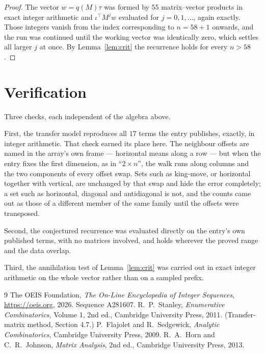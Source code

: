 \documentclass[11pt,a4paper]{article}
\theoremstyle{plain}
\theoremstyle{definition}
\begin{document}
\begin{proof}
The vector $w=q(M)\tau$ was formed by $55$ matrix--vector products in exact integer
arithmetic and $\iota^{\!\top}M^{j}w$ evaluated for $j=0,1,\dots$, again exactly. Those
integers vanish from the index corresponding to $n=58+1$ onwards, and the run was
continued until the working vector was identically zero, which settles all larger $j$ at once.
By Lemma~\ref{lem:crit} the recurrence holds for every $n>58$.
\end{proof}

\section{Verification}

Three checks, each independent of the algebra above.

First, the transfer model reproduces all $17$ terms the entry publishes, exactly, in
integer arithmetic. That check earned its place here. The neighbour offsets are named in the
array's own frame --- horizontal means along a row --- but when the entry fixes the first
dimension, as in ``$2\times n$'', the walk runs along columns and the two components of every
offset swap. Sets such as king-move, or horizontal together with vertical, are unchanged by
that swap and hide the error completely; a set such as horizontal, diagonal and antidiagonal
is not, and the counts came out as those of a different member of the same family until the
offsets were transposed.

Second, the conjectured recurrence was evaluated directly on the entry's own published terms,
with no matrices involved, and holds wherever the proved range and the data overlap.

Third, the annihilation test of Lemma~\ref{lem:crit} was carried out in exact integer
arithmetic on the whole vector rather than on a sampled prefix.

\begin{thebibliography}{9}
 The OEIS Foundation, \emph{The On-Line Encyclopedia of Integer
Sequences}, \url{https://oeis.org}, 2026. Sequence A281607.
 R.~P.~Stanley, \emph{Enumerative Combinatorics}, Volume 1, 2nd ed.,
Cambridge University Press, 2011. (Transfer-matrix method, Section 4.7.)
 P.~Flajolet and R.~Sedgewick, \emph{Analytic Combinatorics}, Cambridge
University Press, 2009.
 R.~A.~Horn and C.~R.~Johnson, \emph{Matrix Analysis}, 2nd ed., Cambridge
University Press, 2013.
\end{thebibliography}
\end{document}
